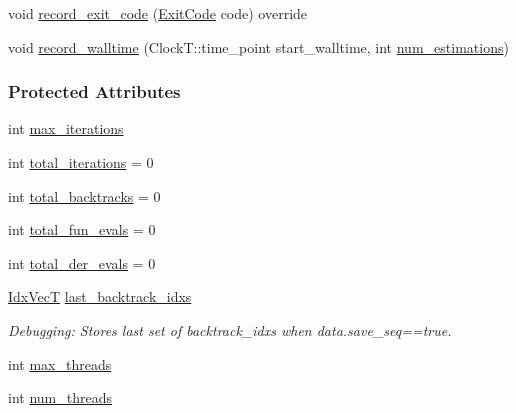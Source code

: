 \begin{DoxyCompactItemize}
\item 
void \hyperlink{classmappel_1_1estimator_1_1ThreadedEstimator_ae5fe99504a34bfd854915a2156ed462c}{record\+\_\+exit\+\_\+code} (\hyperlink{namespacemappel_1_1estimator_ae49999202b8a1968bc308aa30ac24e6c}{Exit\+Code} code) override
\item 
void \hyperlink{classmappel_1_1estimator_1_1Estimator_a864a87d5dc2937e1d67e6bcffb0b5234}{record\+\_\+walltime} (Clock\+T\+::time\+\_\+point start\+\_\+walltime, int \hyperlink{classmappel_1_1estimator_1_1Estimator_a9f5390f0ac3ee127ddcd90dc6f4fd889}{num\+\_\+estimations})
\end{DoxyCompactItemize}
\subsubsection*{Protected Attributes}
\begin{DoxyCompactItemize}
\item 
int \hyperlink{classmappel_1_1estimator_1_1IterativeMaximizer_abf5fe0b08cfbcc403c3d01511726aa38}{max\+\_\+iterations}
\item 
int \hyperlink{classmappel_1_1estimator_1_1IterativeMaximizer_a14a3683e595e1db79b9cbc49b0d8688e}{total\+\_\+iterations} = 0
\item 
int \hyperlink{classmappel_1_1estimator_1_1IterativeMaximizer_a1e081c237c989c530bb101bfb4791073}{total\+\_\+backtracks} = 0
\item 
int \hyperlink{classmappel_1_1estimator_1_1IterativeMaximizer_aa4f49112ff3b145fa1096a7ac4d48af7}{total\+\_\+fun\+\_\+evals} = 0
\item 
int \hyperlink{classmappel_1_1estimator_1_1IterativeMaximizer_a79461b74a026ab06f9d1b4a9f96bdaa0}{total\+\_\+der\+\_\+evals} = 0
\item 
\hyperlink{namespacemappel_ac63743dcd42180127307cd0e4ecdd784}{Idx\+VecT} \hyperlink{classmappel_1_1estimator_1_1IterativeMaximizer_aae10373b4dc244c435059bbc6b0d9704}{last\+\_\+backtrack\+\_\+idxs}
\begin{DoxyCompactList}\small\item\em Debugging\+: Stores last set of backtrack\+\_\+idxs when data.\+save\+\_\+seq==true. \end{DoxyCompactList}\item 
int \hyperlink{classmappel_1_1estimator_1_1ThreadedEstimator_ab4c55ecff71dff47c0584ce20fe7f077}{max\+\_\+threads}
\item 
int \hyperlink{classmappel_1_1estimator_1_1ThreadedEstimator_af746a83929a7217b4084d0e10f850bc3}{num\+\_\+threads}

\end{DoxyCompactItemize}
